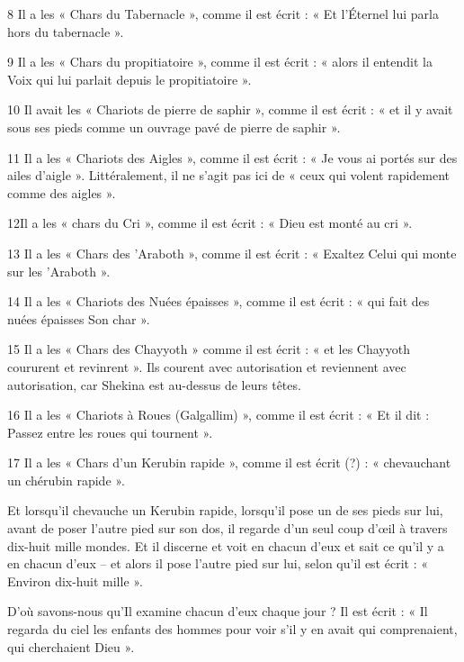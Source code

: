 \par 8 Il a les « Chars du Tabernacle », comme il est écrit : « Et l'Éternel lui parla hors du tabernacle ».

\par 9 Il a les « Chars du propitiatoire », comme il est écrit : « alors il entendit la Voix qui lui parlait depuis le propitiatoire ».

\par 10 Il avait les « Chariots de pierre de saphir », comme il est écrit : « et il y avait sous ses pieds comme un ouvrage pavé de pierre de saphir ».

\par 11 Il a les « Chariots des Aigles », comme il est écrit : « Je vous ai portés sur des ailes d'aigle ». Littéralement, il ne s’agit pas ici de « ceux qui volent rapidement comme des aigles ».

\par 12Il a les « chars du Cri », comme il est écrit : « Dieu est monté au cri ».

\par 13 Il a les « Chars des 'Araboth », comme il est écrit : « Exaltez Celui qui monte sur les 'Araboth ».

\par 14 Il a les « Chariots des Nuées épaisses », comme il est écrit : « qui fait des nuées épaisses Son char ».

\par 15 Il a les « Chars des Chayyoth » comme il est écrit : « et les Chayyoth coururent et revinrent ». Ils courent avec autorisation et reviennent avec autorisation, car Shekina est au-dessus de leurs têtes.

\par 16 Il a les « Chariots à Roues (Galgallim) », comme il est écrit : « Et il dit : Passez entre les roues qui tournent ».

\par 17 Il a les « Chars d'un Kerubin rapide », comme il est écrit (?) : « chevauchant un chérubin rapide ».

\par Et lorsqu'il chevauche un Kerubin rapide, lorsqu'il pose un de ses pieds sur lui, avant de poser l'autre pied sur son dos, il regarde d'un seul coup d'œil à travers dix-huit mille mondes. Et il discerne et voit en chacun d’eux et sait ce qu’il y a en chacun d’eux – et alors il pose l’autre pied sur lui, selon qu’il est écrit : « Environ dix-huit mille ».

\par D'où savons-nous qu'Il examine chacun d'eux chaque jour ? Il est écrit : « Il regarda du ciel les enfants des hommes pour voir s'il y en avait qui comprenaient, qui cherchaient Dieu ».

